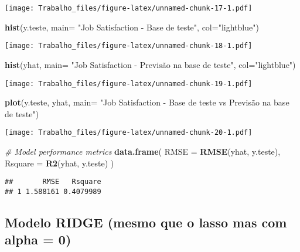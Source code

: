 \documentclass[]{article}
\newenvironment{Shaded}{\begin{snugshade}}{\end{snugshade}}
\newcommand{\KeywordTok}[1]{\textcolor[rgb]{0.13,0.29,0.53}{\textbf{#1}}}
\newcommand{\DataTypeTok}[1]{\textcolor[rgb]{0.13,0.29,0.53}{#1}}
\newcommand{\StringTok}[1]{\textcolor[rgb]{0.31,0.60,0.02}{#1}}
\newcommand{\CommentTok}[1]{\textcolor[rgb]{0.56,0.35,0.01}{\textit{#1}}}
\newcommand{\NormalTok}[1]{#1}
\begin{document}
\texttt{[image: Trabalho\_files/figure-latex/unnamed-chunk-17-1.pdf]}

\begin{Shaded}
\begin{Highlighting}[]
\KeywordTok{hist}\NormalTok{(y.teste, }\DataTypeTok{main=} \StringTok{"Job Satisfaction - Base de teste"}\NormalTok{, }\DataTypeTok{col=}\StringTok{"lightblue"}\NormalTok{)}
\end{Highlighting}
\end{Shaded}

\texttt{[image: Trabalho\_files/figure-latex/unnamed-chunk-18-1.pdf]}

\begin{Shaded}
\begin{Highlighting}[]
\KeywordTok{hist}\NormalTok{(yhat, }\DataTypeTok{main=} \StringTok{"Job Satisfaction - Previsão na base de teste"}\NormalTok{, }\DataTypeTok{col=}\StringTok{"lightblue"}\NormalTok{)}
\end{Highlighting}
\end{Shaded}

\texttt{[image: Trabalho\_files/figure-latex/unnamed-chunk-19-1.pdf]}

\begin{Shaded}
\begin{Highlighting}[]
\KeywordTok{plot}\NormalTok{(y.teste, yhat, }\DataTypeTok{main=} \StringTok{"Job Satisfaction - Base de teste vs Previsão na base de teste"}\NormalTok{)}
\end{Highlighting}
\end{Shaded}

\texttt{[image: Trabalho\_files/figure-latex/unnamed-chunk-20-1.pdf]}

\begin{Shaded}
\begin{Highlighting}[]
\CommentTok{# Model performance metrics}
\KeywordTok{data.frame}\NormalTok{(}
  \DataTypeTok{RMSE =} \KeywordTok{RMSE}\NormalTok{(yhat, y.teste),}
  \DataTypeTok{Rsquare =} \KeywordTok{R2}\NormalTok{(yhat, y.teste)}
\NormalTok{)}
\end{Highlighting}
\end{Shaded}

\begin{verbatim}
##       RMSE   Rsquare
## 1 1.588161 0.4079989
\end{verbatim}

\subsection{Modelo RIDGE (mesmo que o lasso mas com alpha =
0)}\label{modelo-ridge-mesmo-que-o-lasso-mas-com-alpha-0}
\end{document}
